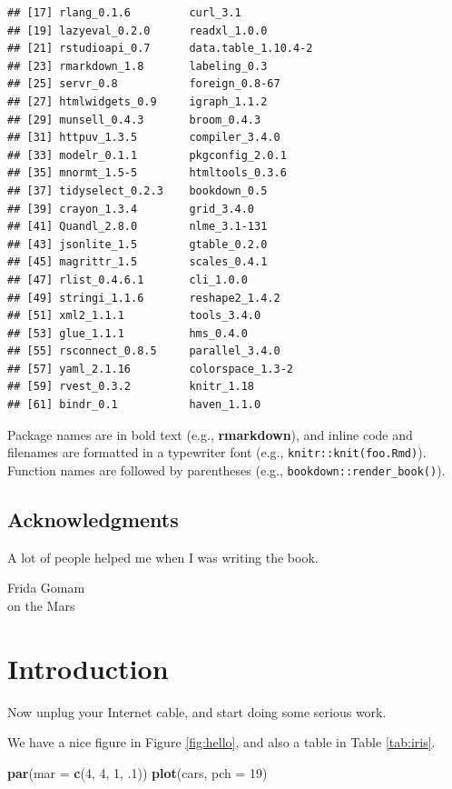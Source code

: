 \documentclass[]{krantz}
\makeatletter
\newenvironment{Shaded}{\begin{snugshade}}{\end{snugshade}}
\newcommand{\KeywordTok}[1]{\textcolor[rgb]{0.13,0.29,0.53}{\textbf{#1}}}
\newcommand{\DataTypeTok}[1]{\textcolor[rgb]{0.13,0.29,0.53}{#1}}
\newcommand{\DecValTok}[1]{\textcolor[rgb]{0.00,0.00,0.81}{#1}}
\newcommand{\NormalTok}[1]{#1}
\newenvironment{kframe}{%
\medskip{}
\setlength{\fboxsep}{.8em}
 \def\at@end@of@kframe{}%
 \ifinner\ifhmode%
  \def\at@end@of@kframe{\end{minipage}}%
  \begin{minipage}{\columnwidth}%
 \fi\fi%
 \def\FrameCommand##1{\hskip\@totalleftmargin \hskip-\fboxsep
 \colorbox{shadecolor}{##1}\hskip-\fboxsep
     \hskip-\linewidth \hskip-\@totalleftmargin \hskip\columnwidth}%
 \MakeFramed {\advance\hsize-\width
   \@totalleftmargin\z@ \linewidth\hsize
   \@setminipage}}%
 {\par\unskip\endMakeFramed%
 \at@end@of@kframe}
\renewenvironment{Shaded}{\begin{kframe}}{\end{kframe}}
\let\BeginKnitrBlock\begin \let\EndKnitrBlock\end
\makeatother
\begin{document}
\begin{verbatim}
## [17] rlang_0.1.6         curl_3.1           
## [19] lazyeval_0.2.0      readxl_1.0.0       
## [21] rstudioapi_0.7      data.table_1.10.4-2
## [23] rmarkdown_1.8       labeling_0.3       
## [25] servr_0.8           foreign_0.8-67     
## [27] htmlwidgets_0.9     igraph_1.1.2       
## [29] munsell_0.4.3       broom_0.4.3        
## [31] httpuv_1.3.5        compiler_3.4.0     
## [33] modelr_0.1.1        pkgconfig_2.0.1    
## [35] mnormt_1.5-5        htmltools_0.3.6    
## [37] tidyselect_0.2.3    bookdown_0.5       
## [39] crayon_1.3.4        grid_3.4.0         
## [41] Quandl_2.8.0        nlme_3.1-131       
## [43] jsonlite_1.5        gtable_0.2.0       
## [45] magrittr_1.5        scales_0.4.1       
## [47] rlist_0.4.6.1       cli_1.0.0          
## [49] stringi_1.1.6       reshape2_1.4.2     
## [51] xml2_1.1.1          tools_3.4.0        
## [53] glue_1.1.1          hms_0.4.0          
## [55] rsconnect_0.8.5     parallel_3.4.0     
## [57] yaml_2.1.16         colorspace_1.3-2   
## [59] rvest_0.3.2         knitr_1.18         
## [61] bindr_0.1           haven_1.1.0
\end{verbatim}

Package names are in bold text (e.g., \textbf{rmarkdown}), and inline
code and filenames are formatted in a typewriter font (e.g.,
\texttt{knitr::knit(\textquotesingle{}foo.Rmd\textquotesingle{})}).
Function names are followed by parentheses (e.g.,
\texttt{bookdown::render\_book()}).

\section*{Acknowledgments}\label{acknowledgments}


A lot of people helped me when I was writing the book.

\BeginKnitrBlock{flushright}
Frida Gomam\\
on the Mars
\EndKnitrBlock{flushright}

\mainmatter

\chapter*{Introduction}\label{introduction}


Now unplug your Internet cable, and start doing some serious work.

We have a nice figure in Figure \ref{fig:hello}, and also a table in
Table \ref{tab:iris}.

\begin{Shaded}
\begin{Highlighting}[]
\KeywordTok{par}\NormalTok{(}\DataTypeTok{mar =} \KeywordTok{c}\NormalTok{(}\DecValTok{4}\NormalTok{, }\DecValTok{4}\NormalTok{, }\DecValTok{1}\NormalTok{, .}\DecValTok{1}\NormalTok{))}
\KeywordTok{plot}\NormalTok{(cars, }\DataTypeTok{pch =} \DecValTok{19}\NormalTok{)}
\end{Highlighting}
\end{Shaded}
\end{document}
